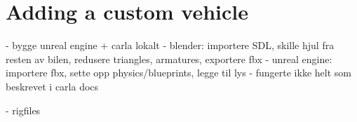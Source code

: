 \section{Adding a custom vehicle}

- bygge unreal engine + carla lokalt
- blender: importere SDL, skille hjul fra resten av bilen, redusere triangles, armatures, exportere fbx
- unreal engine: importere fbx, sette opp physics/blueprints, legge til lys
    - fungerte ikke helt som beskrevet i carla docs

- rigfiles
